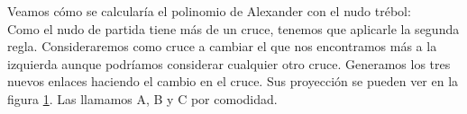 \documentclass[14pt]{extarticle}
\begin{document}
Veamos cómo se calcularía el polinomio de Alexander con el nudo trébol:\\
Como el nudo de partida tiene más de un cruce, tenemos que aplicarle la segunda regla. Consideraremos como cruce a cambiar el que nos encontramos más a la izquierda aunque podríamos considerar cualquier otro cruce. Generamos los tres nuevos enlaces haciendo el cambio en el cruce. Sus proyección se pueden ver en la figura \ref{alex2}. Las llamamos A, B y C por comodidad. 
   \begin{figure}[h!]
   	\centering
   	\caption{}
   	\label{alex2} 
   \end{figure}
\end{document}
